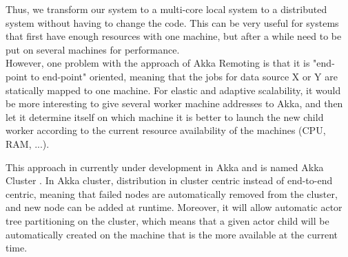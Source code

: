 Thus, we transform our system to a multi-core local system to a distributed system without having to change the code. This can be very useful for systems that first have enough resources with one machine, but after a while need to be put on several machines for performance.
\\

However, one problem with the approach of Akka Remoting is that it is "end-point to end-point" oriented, meaning that the jobs for data source X or Y are statically
mapped to one machine. For elastic and adaptive scalability, it would be more interesting to give several worker machine addresses to Akka, and then let it determine itself on which machine it is better to launch the new child worker according to the current resource availability of the machines (CPU, RAM, ...).

This approach in currently under development in Akka and is named Akka Cluster . In Akka cluster, distribution in cluster centric instead of end-to-end centric, meaning that failed nodes are automatically removed from the cluster, and new node can be added at runtime. Moreover, it will allow automatic actor tree partitioning on the cluster, which means that a given actor child will be automatically created on the machine that is the more available at the current time.

